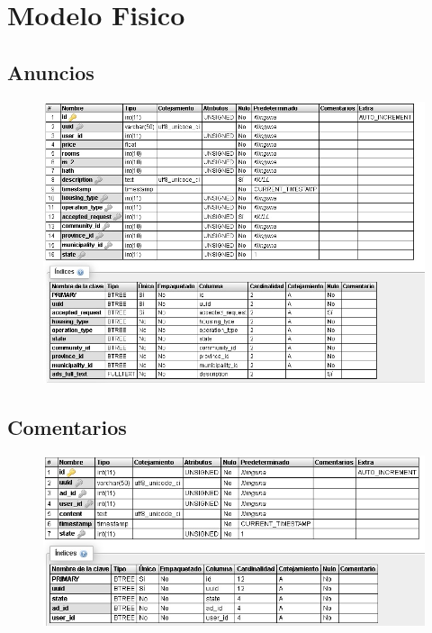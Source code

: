 \chapter{Modelo Fisico}

\section{Anuncios}
\begin{figure}[h]
\centering
\includegraphics[width=1\textwidth]{Img/Disenyo/BD_ADS.jpg}
\end{figure}

\pagebreak

\section{Comentarios}
\begin{figure}[h]
\centering
\includegraphics[width=1\textwidth]{Img/Disenyo/BD_COMMENTS.jpg}
\end{figure}


